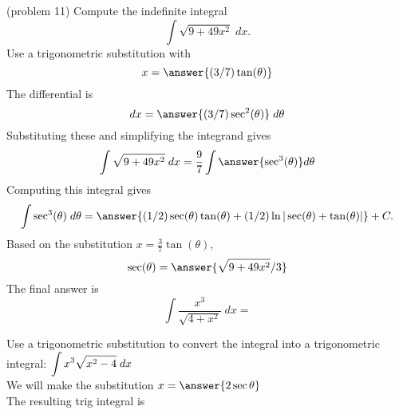 \documentclass[handout]{ximera}
\begin{document}
\begin{problem}(problem 11)
Compute the indefinite integral
\[
\int \sqrt{9 + 49x^2} \; dx.
\]
Use a trigonometric substitution with\\
\[
x = \answer{(3/7)\tan(\theta)}
\]
The differential is\\
\[
dx = \answer{(3/7)\sec^2(\theta)} \; d\theta
\]
Substituting these and simplifying the integrand gives\\
\[
\int \sqrt{9 + 49x^2} \; dx = \frac97 \int \answer{\sec^3(\theta)} d\theta
\]
Computing this integral gives
\[
\int \sec^3(\theta) \; d\theta = \answer{(1/2)\sec(\theta) \tan(\theta) + (1/2)\ln|\sec(\theta)+\tan(\theta)|} + C.
\]
Based on the substitution $x = \frac37 \tan(\theta)$, \\
\[
\sec(\theta) = \answer{\sqrt{9+49x^2}/3}
\]
The final answer is
\[
\int  \frac{x^3}{\sqrt{4 + x^2}} \; dx = 
\]
\begin{center}
\begin{multipleChoice}
\end{multipleChoice}
\end{center}
\end{problem}











\begin{center}
\begin{foldable}
\end{foldable}
\end{center}


\begin{problem}
Use a trigonometric substitution to convert the integral into a trigonometric integral: $\displaystyle \int x^3 \sqrt{x^2 -4} \; dx$\\
We will make the substitution $x = \answer{2\sec \theta}$\\
The resulting trig integral is
\begin{center}
\begin{multipleChoice}
 \\
 
\end{multipleChoice}
\end{center}
\end{problem}
\end{document}

